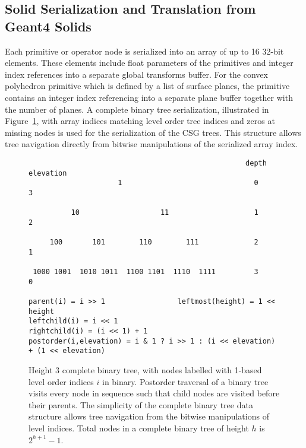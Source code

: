\documentclass{webofc}
\begin{document}
\subsection{Solid Serialization and Translation from Geant4 Solids}
\label{translation}
%
Each primitive or operator node is serialized into an array of up to 16 32-bit elements. 
These elements include float parameters of the primitives and integer index references 
into a separate global transforms buffer. For the convex polyhedron primitive which is defined by a list of surface planes, 
the primitive contains an integer index referencing into a separate plane buffer together with the number of planes. 
A complete binary tree serialization, illustrated in Figure~\ref{tree},  with array indices matching level order tree indices
and zeros at missing nodes is used for the serialization of the CSG trees. This structure   
allows tree navigation directly from bitwise manipulations of the serialized array index. 
%
\begin{figure}[ht]
\begin{verbatim}
                                                   depth     elevation
                     1                               0           3   

          10                   11                    1           2   

     100       101        110        111             2           1   
                    
 1000 1001  1010 1011  1100 1101  1110  1111         3           0   

parent(i) = i >> 1                 leftmost(height) = 1 << height 
leftchild(i) = i << 1               
rightchild(i) = (i << 1) + 1  
postorder(i,elevation) = i & 1 ? i >> 1 : (i << elevation) + (1 << elevation) 
\end{verbatim}

\caption{Height 3 complete binary tree, with nodes labelled with 1-based level order indices $i$ in binary. Postorder traversal of a binary tree
visits every node in sequence such that child nodes are visited before their parents. The simplicity of the complete binary tree data structure allows tree navigation 
from the bitwise manipulations of level indices. Total nodes in a complete binary tree of height $h$ is $2^{h+1} - 1$.  }
\label{tree}
\end{figure}
\end{document}
